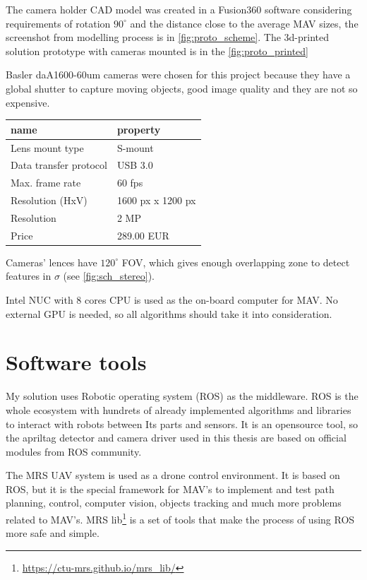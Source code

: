 The camera holder CAD model was created in a Fusion360 software considering requirements of rotation $90^\circ$ and the distance close to the average MAV sizes, the screenshot from modelling process is in \autoref{fig:proto_scheme}.
The 3d-printed solution prototype with cameras mounted is in the \autoref{fig:proto_printed}

Basler daA1600-60um cameras were chosen for this project because they have a global shutter to capture moving objects, good image quality and they are not so expensive.
\begin{center}
    \begin{tabular}{ l l }
    \hline
    name                   & property          \\ \hline
    Lens mount type        & S-mount           \\
    Data transfer protocol & USB 3.0           \\
    Max. frame rate        & 60 fps            \\
    Resolution (HxV)       & 1600 px x 1200 px \\
    Resolution             & 2 MP              \\
    Price                  & 289.00 EUR        \\ \hline
    \end{tabular}
\end{center}

Cameras' lences have $120^\circ$ FOV, which gives enough overlapping zone to detect features in $\sigma$ (see \autoref{fig:sch_stereo}).

Intel NUC with 8 cores CPU is used as the on-board computer for MAV. 
No external GPU is needed, so all algorithms should take it into consideration.

\section{Software tools}
\label{sec:impl_software}

My solution uses Robotic operating system (ROS)\cite{Rospaper} as the middleware.
ROS is the whole ecosystem with hundrets of already implemented algorithms and libraries to interact with robots between Its parts and sensors.
It is an opensource tool, so the apriltag detector and camera driver used in this thesis are based on official modules from ROS community.

The MRS UAV system \cite{Baca2021} is used as a drone control environment. It is based on ROS, but it is the special framework for MAV's to implement and test path planning, control, computer vision, objects tracking and much more problems related to MAV's.
MRS lib\footnote{\url{https://ctu-mrs.github.io/mrs_lib/}} is a set of tools that make the process of using ROS more safe and simple.

